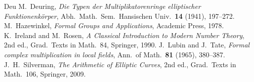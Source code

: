\documentclass[reqno]{amsart}
\theoremstyle{definition}
\theoremstyle{plain}
\begin{document}
\begin{thebibliography}{Deu}
 M.~Deuring, \emph{Die Typen der Multiplikatorenringe elliptischer Funktionenk\"orper}, Abh.\ Math.\ Sem.\ Hansischen Univ.\ \textbf{14} (1941), 197--272.
 M.~Hazewinkel, \emph{Formal Groups and Applications}, Academic Press, 1978.
 K.~Ireland and M.~Rosen, \emph{A Classical Introduction to Modern Number Theory}, 2nd ed., Grad.\ Texts in Math.\ 84, Springer, 1990.
 J.~Lubin and J.~Tate, \emph{Formal complex multiplication in local fields}, Ann.\ of Math.\ \textbf{81} (1965), 380--387.
 J.~H.~Silverman, \emph{The Arithmetic of Elliptic Curves}, 2nd ed., Grad.\ Texts in Math.\ 106, Springer, 2009.
\end{thebibliography}
\end{document}
